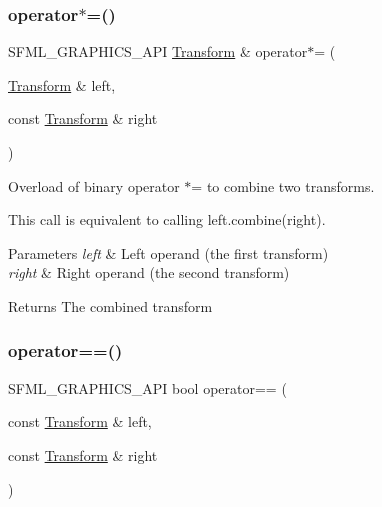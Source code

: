 \subsubsection{\texorpdfstring{operator$\ast$=()}{operator*=()}}
{\footnotesize\ttfamily S\+F\+M\+L\+\_\+\+G\+R\+A\+P\+H\+I\+C\+S\+\_\+\+A\+PI \mbox{\hyperlink{classsf_1_1_transform}{Transform}} \& operator$\ast$= (\begin{DoxyParamCaption}\item[{\mbox{\hyperlink{classsf_1_1_transform}{Transform}} \&}]{left,  }\item[{const \mbox{\hyperlink{classsf_1_1_transform}{Transform}} \&}]{right }\end{DoxyParamCaption})\hspace{0.3cm}{\ttfamily [related]}}



Overload of binary operator $\ast$= to combine two transforms. 

This call is equivalent to calling left.\+combine(right).


\begin{DoxyParams}{Parameters}
{\em left} & Left operand (the first transform) \\
\hline
{\em right} & Right operand (the second transform)\\
\hline
\end{DoxyParams}
\begin{DoxyReturn}{Returns}
The combined transform \begin{DoxyVerb}\end{DoxyVerb}
 
\end{DoxyReturn}
\mbox{\label{classsf_1_1_transform_a542b6e28b891d92b68acbb6cf4c1165e}} 
\subsubsection{\texorpdfstring{operator==()}{operator==()}}
{\footnotesize\ttfamily S\+F\+M\+L\+\_\+\+G\+R\+A\+P\+H\+I\+C\+S\+\_\+\+A\+PI bool operator== (\begin{DoxyParamCaption}\item[{const \mbox{\hyperlink{classsf_1_1_transform}{Transform}} \&}]{left,  }\item[{const \mbox{\hyperlink{classsf_1_1_transform}{Transform}} \&}]{right }\end{DoxyParamCaption})\hspace{0.3cm}{\ttfamily [related]}}



